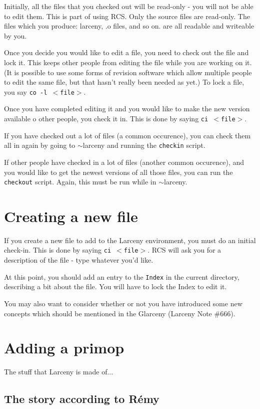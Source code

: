 Initially, all the files that you checked out will be read-only - you 
will not be able to edit them.  This is part of using RCS.  Only 
the source files are read-only.  The files which you produce: larceny,
.o files, and so on. are all readable and writeable by you.

Once you decide you would like to edit a file, you need to check out the
file and lock it.  This keeps other people from editing the file while
you are working on it.  (It is possible to use some forms of revision
software which allow multiple people to edit the same file, but that
hasn't really been needed as yet.)  To lock a file, you say 
{\tt co -l $<$file$>$}.  

Once you have completed editing it and you would like to make the new
version available o other people, you check it in.  This is done by
saying {\tt ci $<$file$>$}.

If you have checked out a lot of files (a common occurence), you can
check them all in again by going to $\sim$larceny and running the
{\tt checkin} script.

If other people have checked in a lot of files (another common
occurence), and you would like to get the newest versions of all those
files, you can run the {\tt checkout} script.  Again, this must be
run while in $\sim$larceny.

\section{Creating a new file}

If you create a new file to add to the Larceny environment, you must
do an initial check-in.  This is done by saying {\tt ci $<$file$>$}.
RCS will ask you for a description of the file - type whatever you'd
like.  

At this point, you should add an entry to the {\tt Index} in the current
directory, describing a bit about the file.  You will have to lock the
Index to edit it. 

You may also want to consider whether or not you have introduced some
new concepts which should be mentioned in the Glarceny (Larceny Note \#666).

\section{Adding a primop}

The stuff that Larceny is made of...

\subsection{The story according to R\'{e}my}


